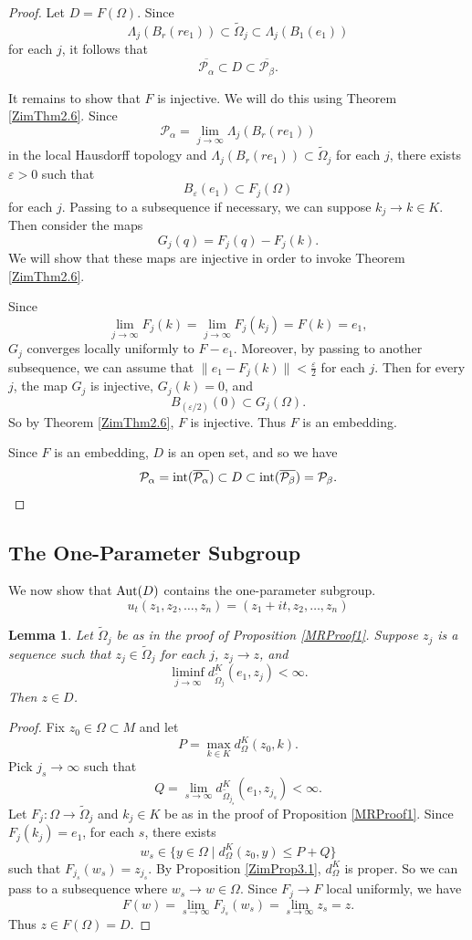 \documentclass[12pt]{article}
\newcommand{\Aut}{\textup{Aut}}
\newcommand{\Int}{\textup{int}}
\newtheorem{lemma}{Lemma}[section]
\begin{document}
\begin{proof}
Let $D=F(\Omega)$. Since 
$$\Lambda_j\left(B_r(re_1)\right)\subset\widetilde{\Omega}_j\subset\Lambda_j\left(B_1(e_1)\right)$$
for each $j$, it follows that 
$$\overline{\mathcal{P}_{\alpha}}\subset D\subset\overline{\mathcal{P}_{\beta}}.$$

It remains to show that $F$ is injective. We will do this using Theorem \ref{ZimThm2.6}. Since 
$$\mathcal{P}_{\alpha}=\lim_{j\to\infty}\Lambda_j\left(B_r(re_1)\right)$$
in the local Hausdorff topology and $\Lambda_j\left(B_r(re_1)\right)\subset\widetilde{\Omega}_j$ for each $j$, there exists $\varepsilon>0$ such that 
$$B_{\varepsilon}(e_1)\subset F_j(\Omega)$$
for each $j$. Passing to a subsequence if necessary, we can suppose $k_j\to k\in K$. Then consider the maps
$$G_j(q)=F_j(q)-F_j(k).$$
We will show that these maps are injective in order to invoke Theorem \ref{ZimThm2.6}.

Since 
$$\lim_{j\to\infty}F_j(k)=\lim_{j\to\infty}F_j(k_j)=F(k)=e_1,$$
$G_j$ converges locally uniformly to $F-e_1$. Moreover, by passing to another subsequence, we can assume that $\|e_1-F_j(k)\|<\frac{\varepsilon}{2}$ for each $j$. Then for every $j$, the map $G_j$ is injective, $G_j(k)=0$, and 
$$B_{(\varepsilon/2)}\left(0\right)\subset G_j(\Omega).$$
So by Theorem \ref{ZimThm2.6}, $F$ is injective. Thus $F$ is an embedding. 

Since $F$ is an embedding, $D$ is an open set, and so we have 
$$\mathcal{P}_{\alpha}=\Int(\overline{\mathcal{P}_{\alpha}})\subset D\subset \Int(\overline{\mathcal{P}_{\beta}})=\mathcal{P}_{\beta}.$$
\end{proof}

\subsection{The One-Parameter Subgroup}

We now show that $\Aut(D)$ contains the one-parameter subgroup.
\[
u_t(z_1,z_2,\dots,z_n)=(z_1+it,z_2,\dots,z_n)
\]

\begin{lemma}
\label{ZimLem4.7}
Let $\widetilde{\Omega}_j$ be as in the proof of Proposition \ref{MRProof1}. Suppose $z_j$ is a sequence such that $z_j\in\widetilde{\Omega}_j$ for each $j$, $z_j\to z$, and 
$$\liminf_{j\to\infty}d_{\widetilde{\Omega}_j}^K(e_1,z_j)<\infty.$$
Then $z\in D$.
\end{lemma}

\begin{proof}
Fix $z_0\in\Omega\subset M$ and let 
$$P=\max_{k\in K}d_{\Omega}^{K}(z_0,k).$$
Pick $j_s\to\infty$ such that 
$$Q=\lim_{s\to\infty}d_{\widetilde{\Omega}_{j_s}}^K(e_1,z_{j_s})<\infty.$$
Let $F_j:\Omega\to\widetilde{\Omega}_j$ and $k_j\in K$ be as in the proof of Proposition \ref{MRProof1}. Since $F_j(k_j)=e_1$, for each $s$, there exists
$$w_s\in\{y\in\Omega\mid d_{\Omega}^K(z_0,y)\le P+Q\}$$
such that $F_{j_s}(w_s)=z_{j_s}$. By Proposition \ref{ZimProp3.1}, $d_{\Omega}^K$ is proper. So we can pass to a subsequence where $w_s\to w\in\Omega$. Since $F_j\to F$ local uniformly, we have
$$F(w)=\lim_{s\to\infty}F_{j_s}(w_s)=\lim_{s\to\infty}z_s=z.$$
Thus $z\in F(\Omega)=D$. 
\end{proof}
\end{document}

